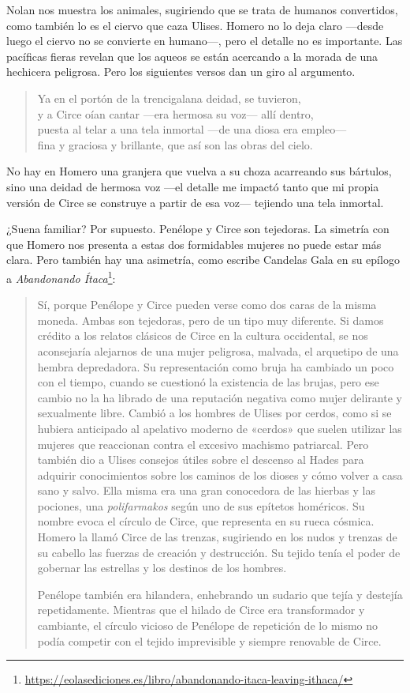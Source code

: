 \documentclass[11pt,a4paper]{article}
\begin{document}
Nolan nos muestra los animales, sugiriendo que se trata de humanos convertidos, como también lo es el ciervo que caza Ulises. Homero no lo deja claro ---desde luego el ciervo no se convierte en humano---, pero el detalle no es importante. Las pacíficas fieras revelan que los aqueos se están acercando a la morada de una hechicera peligrosa. Pero los siguientes versos dan un giro al argumento.

\begin{verse}
Ya en el portón de la trencigalana deidad, se tuvieron,\\
y a Circe oían cantar ---era hermosa su voz--- allí dentro,\\
puesta al telar a una tela inmortal ---de una diosa era empleo---\\
fina y graciosa y brillante, que así son las obras del cielo.
\end{verse}

No hay en Homero una granjera que vuelva a su choza acarreando sus bártulos, sino una deidad de hermosa voz ---el detalle me impactó tanto que mi propia versión de Circe se construye a partir de esa voz--- tejiendo una tela inmortal.

¿Suena familiar? Por supuesto. Penélope y Circe son tejedoras. La simetría con que Homero nos presenta a estas dos formidables mujeres no puede estar más clara. Pero también hay una asimetría, como escribe Candelas Gala en su epílogo a \emph{Abandonando Ítaca}\footnote{\url{https://eolasediciones.es/libro/abandonando-itaca-leaving-ithaca/}}:

\begin{quotation}
Sí, porque Penélope y Circe pueden verse como dos caras de la misma moneda. Ambas son tejedoras, pero de un tipo muy diferente. Si damos crédito a los relatos clásicos de Circe en la cultura occidental, se nos aconsejaría alejarnos de una mujer peligrosa, malvada, el arquetipo de una hembra depredadora. Su representación como bruja ha cambiado un poco con el tiempo, cuando se cuestionó la existencia de las brujas, pero ese cambio no la ha librado de una reputación negativa como mujer delirante y sexualmente libre. Cambió a los hombres de Ulises por cerdos, como si se hubiera anticipado al apelativo moderno de «cerdos» que suelen utilizar las mujeres que reaccionan contra el excesivo machismo patriarcal. Pero también dio a Ulises consejos útiles sobre el descenso al Hades para adquirir conocimientos sobre los caminos de los dioses y cómo volver a casa sano y salvo. Ella misma era una gran conocedora de las hierbas y las pociones, una \emph{polifarmakos} según uno de sus epítetos homéricos. Su nombre evoca el círculo de Circe, que representa en su rueca cósmica. Homero la llamó Circe de las trenzas, sugiriendo en los nudos y trenzas de su cabello las fuerzas de creación y destrucción. Su tejido tenía el poder de gobernar las estrellas y los destinos de los hombres.

Penélope también era hilandera, enhebrando un sudario que tejía y destejía repetidamente. Mientras que el hilado de Circe era transformador y cambiante, el círculo vicioso de Penélope de repetición de lo mismo no podía competir con el tejido imprevisible y siempre renovable de Circe.
\end{quotation}
\end{document}
